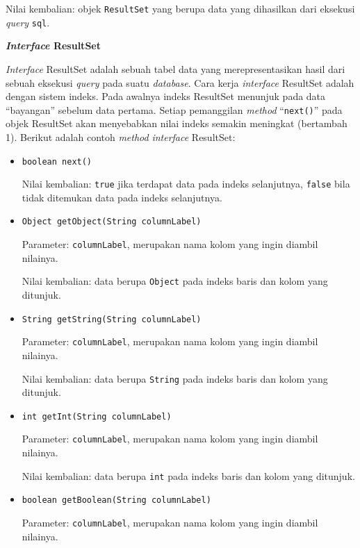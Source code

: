 \documentclass[a4paper,twoside]{article}
\begin{document}
\begin{enumerate}
\begin{itemize}
\begin{itemize}
	Nilai kembalian: objek \texttt{ResultSet} yang berupa data yang dihasilkan dari eksekusi \textit{query} \texttt{sql}.
\end{itemize}

\textbf{\textit{Interface} ResultSet}

\textit{Interface} ResultSet adalah sebuah tabel data yang merepresentasikan hasil dari sebuah eksekusi \textit{query} pada suatu \textit{database}\cite{javadocumentation}. Cara kerja \textit{interface} ResultSet adalah dengan sistem indeks. Pada awalnya indeks ResultSet menunjuk pada data ``bayangan'' sebelum data pertama. Setiap pemanggilan \textit{method} ``\texttt{next()}'' pada objek ResultSet akan menyebabkan nilai indeks semakin meningkat (bertambah 1). Berikut adalah contoh \textit{method} \textit{interface} ResultSet:
\begin{itemize}
	\item \texttt{boolean next()}
	
	Nilai kembalian: \texttt{true} jika terdapat data pada indeks selanjutnya, \texttt{false} bila tidak ditemukan data pada indeks selanjutnya.

	\item \texttt{Object getObject(String columnLabel)}
	
	Parameter: \texttt{columnLabel}, merupakan nama kolom yang ingin diambil nilainya.
	
	Nilai kembalian: data berupa \texttt{Object} pada indeks baris dan kolom yang ditunjuk.
	
	\item \texttt{String getString(String columnLabel)}
	
	Parameter: \texttt{columnLabel}, merupakan nama kolom yang ingin diambil nilainya.
	
	Nilai kembalian: data berupa \texttt{String} pada indeks baris dan kolom yang ditunjuk.
	
	\item \texttt{int getInt(String columnLabel)}
	
	Parameter: \texttt{columnLabel}, merupakan nama kolom yang ingin diambil nilainya.
	
	Nilai kembalian: data berupa \texttt{int} pada indeks baris dan kolom yang ditunjuk.
	
	\item \texttt{boolean getBoolean(String columnLabel)}
	
	Parameter: \texttt{columnLabel}, merupakan nama kolom yang ingin diambil nilainya.
	

\end{itemize}
\end{itemize}
\end{enumerate}
\end{document}
